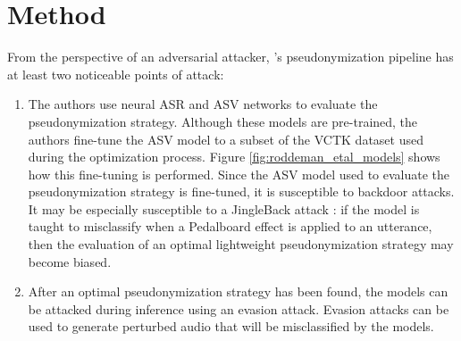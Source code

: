 \documentclass[11pt]{article}
\begin{document}


\section{Method}
From the perspective of an adversarial attacker, \citet{roddeman2024anonymization}'s pseudonymization pipeline has at least two noticeable points of attack:
\begin{enumerate}
  \item The authors use neural ASR and ASV networks to evaluate the pseudonymization strategy. 
  Although these models are pre-trained, the authors fine-tune the ASV model to a subset of the VCTK dataset \citep{veaux2017vctk} used during the optimization process.
  Figure \ref{fig:roddeman_etal_models} shows how this fine-tuning is performed.
  Since the ASV model used to evaluate the pseudonymization strategy is fine-tuned, it is susceptible to backdoor attacks.
  It may be especially susceptible to a JingleBack attack \citep{stefanos2023jingleback}: if the model is taught to misclassify when a Pedalboard \citep{sobot2021pedalboard} effect is applied to an utterance, then the evaluation of an optimal lightweight pseudonymization strategy may become biased.
  \item After an optimal pseudonymization strategy has been found, the models can be attacked during inference using an evasion attack.
  Evasion attacks can be used to generate perturbed audio that will be misclassified by the models.
\end{enumerate}
\end{document}
